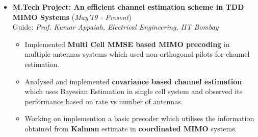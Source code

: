 \documentclass[10pt]{article}
\begin{document}

\vspace*{114pt}


\colorbox{bl}{}%
\vspace{-0.08cm}
\begin{itemize}[leftmargin=0.4cm]
\item \textbf{M.Tech Project: An efficient channel estimation scheme in TDD MIMO Systems}
\hfill{(\textit{May'19 - Present})} \\
Guide: \textit{Prof. Kumar Appaiah, Electrical Engineering, IIT Bombay}\\
\vspace{-0.6cm}
\begin{itemize}
\item Implemented \textbf{Multi Cell MMSE based MIMO precoding} in multiple antennas systems which used non-orthogonal pilots for channel estimation.\vspace{-0.1cm}
\item Analysed and implemented \textbf{covariance based channel estimation} which uses Bayesian Estimation in single cell system and observed its performance based on rate vs number of antennas. 
\vspace{-0.1cm}
\end{itemize}
\vspace{-0.2cm}

\begin{itemize}
\item  Working on implemention a basic precoder which utilises the information obtained from \textbf{Kalman} estimate in \textbf{coordinated MIMO} systems.\vspace{-0.1cm}
\end{itemize}


\end{itemize}
\end{document}
